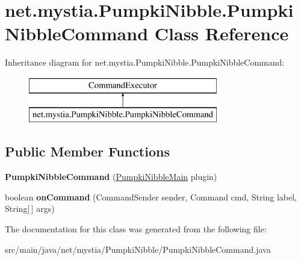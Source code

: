 \hypertarget{classnet_1_1mystia_1_1_pumpki_nibble_1_1_pumpki_nibble_command}{\section{net.\-mystia.\-Pumpki\-Nibble.\-Pumpki\-Nibble\-Command Class Reference}
\label{classnet_1_1mystia_1_1_pumpki_nibble_1_1_pumpki_nibble_command}
}
Inheritance diagram for net.\-mystia.\-Pumpki\-Nibble.\-Pumpki\-Nibble\-Command\-:\begin{figure}[H]
\begin{center}
\leavevmode
\includegraphics[height=2.000000cm]{classnet_1_1mystia_1_1_pumpki_nibble_1_1_pumpki_nibble_command}
\end{center}
\end{figure}
\subsection*{Public Member Functions}
\begin{DoxyCompactItemize}
\item 
\hypertarget{classnet_1_1mystia_1_1_pumpki_nibble_1_1_pumpki_nibble_command_aa5f604bca73970450a56f0f0b2125a55}{{\bfseries Pumpki\-Nibble\-Command} (\hyperlink{classnet_1_1mystia_1_1_pumpki_nibble_1_1_pumpki_nibble_main}{Pumpki\-Nibble\-Main} plugin)}\label{classnet_1_1mystia_1_1_pumpki_nibble_1_1_pumpki_nibble_command_aa5f604bca73970450a56f0f0b2125a55}

\item 
\hypertarget{classnet_1_1mystia_1_1_pumpki_nibble_1_1_pumpki_nibble_command_aee6de0c53289a26af562d3a80ea7f9be}{boolean {\bfseries on\-Command} (Command\-Sender sender, Command cmd, String label, String\mbox{[}$\,$\mbox{]} args)}\label{classnet_1_1mystia_1_1_pumpki_nibble_1_1_pumpki_nibble_command_aee6de0c53289a26af562d3a80ea7f9be}

\end{DoxyCompactItemize}


The documentation for this class was generated from the following file\-:\begin{DoxyCompactItemize}
\item 
src/main/java/net/mystia/\-Pumpki\-Nibble/Pumpki\-Nibble\-Command.\-java\end{DoxyCompactItemize}
